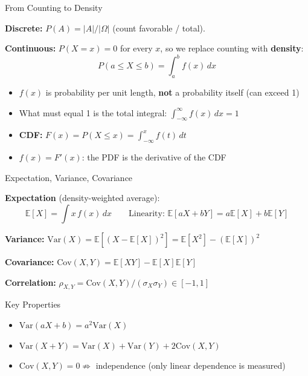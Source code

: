 \documentclass[aspectratio=169, professionalfonts]{beamer}
\def\E{\mathbb{E}}
\def\Var{\text{Var}}
\def\Cov{\text{Cov}}
\begin{document}
\begin{frame}{From Counting to Density}

\textbf{Discrete:} $P(A) = |A|/|\Omega|$ (count favorable / total).

\bigskip

\textbf{Continuous:} $P(X = x) = 0$ for every $x$, so we replace counting with \textbf{density}:
$$P(a \leq X \leq b) = \int_a^b f(x)\,dx$$

\bigskip

\begin{itemize}
  \item $f(x)$ is probability per unit length, \textbf{not} a probability itself (can exceed 1)
  \item What must equal 1 is the total integral: $\int_{-\infty}^{\infty} f(x)\,dx = 1$
  \item \textbf{CDF:} $F(x) = P(X \leq x) = \int_{-\infty}^{x} f(t)\,dt$
  \item $f(x) = F'(x)$: the PDF is the derivative of the CDF
\end{itemize}

\end{frame}

\begin{frame}{Expectation, Variance, Covariance}

\textbf{Expectation} (density-weighted average):
$$\E[X] = \int x\,f(x)\,dx \qquad \text{Linearity: } \E[aX + bY] = a\E[X] + b\E[Y]$$

\textbf{Variance:} $\Var(X) = \E[(X - \E[X])^2] = \E[X^2] - (\E[X])^2$

\bigskip

\textbf{Covariance:} $\Cov(X,Y) = \E[XY] - \E[X]\E[Y]$

\smallskip

\textbf{Correlation:} $\rho_{X,Y} = \Cov(X,Y)/(\sigma_X\sigma_Y) \in [-1,1]$

\bigskip

\begin{block}{Key Properties}
\begin{itemize}
  \item $\Var(aX + b) = a^2\Var(X)$
  \item $\Var(X+Y) = \Var(X) + \Var(Y) + 2\Cov(X,Y)$
  \item $\Cov(X,Y) = 0 \not\Rightarrow$ independence (only linear dependence is measured)
\end{itemize}
\end{block}

\end{frame}
\end{document}
